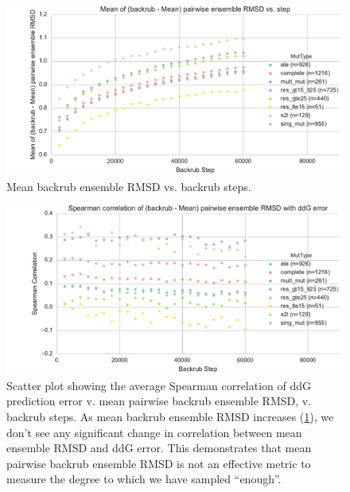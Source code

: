 \documentclass{article}
\newcommand\ddg{$\Delta\Delta G$}
\begin{document}
\begin{figure}
  \centering
  \includegraphics[width=\textwidth,keepaspectratio]{figures/t14-mean-ensemble-error.pdf}
  \caption{
    Mean backrub ensemble RMSD vs. backrub steps.
  } \label{fig:t14-mean-ensemble}
\end{figure}

\begin{figure}
  \centering
  \includegraphics[width=\textwidth,keepaspectratio]{figures/t14-spear-corr.pdf}
  \caption[\ddg\ prediction error vs. ensemble RMSD]{
    Scatter plot showing the average Spearman correlation of ddG prediction error v. mean pairwise backrub ensemble RMSD, v. backrub steps.
    As mean backrub ensemble RMSD increases (\cref{fig:t14-mean-ensemble}), we don't see any significant change in correlation between mean ensemble RMSD and ddG error.
    This demonstrates that mean pairwise backrub ensemble RMSD is not an effective metric to measure the degree to which we have sampled ``enough''.
  } \label{fig:spear-corr-rmsd-error}
\end{figure}
\end{document}
